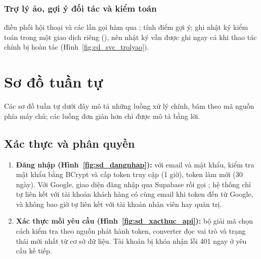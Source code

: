 
\subsubsection{Trợ lý ảo, gợi ý đối tác và kiểm toán}
 điều phối hội thoại và các lần gọi hàm qua ;  tính điểm gợi ý;  ghi nhật ký kiểm toán trong một giao dịch riêng (), nên nhật ký vẫn được ghi ngay cả khi thao tác chính bị hoàn tác (Hình~\ref{fig:cd_svc_trolyao}).


\section{Sơ đồ tuần tự}
\label{sec:sequence}

Các sơ đồ tuần tự dưới đây mô tả những luồng xử lý chính, bám theo mã nguồn phía máy chủ; các luồng đơn giản hơn chỉ được mô tả bằng lời.

\subsection{Xác thực và phân quyền}
\begin{enumerate}
    \item \textbf{Đăng nhập (Hình~\ref{fig:sd_dangnhap}):} với email và mật khẩu,  kiểm tra mật khẩu bằng BCrypt và cấp token truy cập (1 giờ), token làm mới (30 ngày). Với Google, giao diện đăng nhập qua Supabase rồi gọi ; hệ thống chỉ tự liên kết với tài khoản khách hàng có cùng email khi token đến từ Google, và không bao giờ tự liên kết với tài khoản nhân viên hay quản trị.
    \item \textbf{Xác thực mỗi yêu cầu (Hình~\ref{fig:sd_xacthuc_api}):} bộ giải mã chọn cách kiểm tra theo nguồn phát hành token, converter đọc vai trò và trạng thái mới nhất từ cơ sở dữ liệu. Tài khoản bị khóa nhận lỗi 401 ngay ở yêu cầu kế tiếp.
\end{enumerate}


